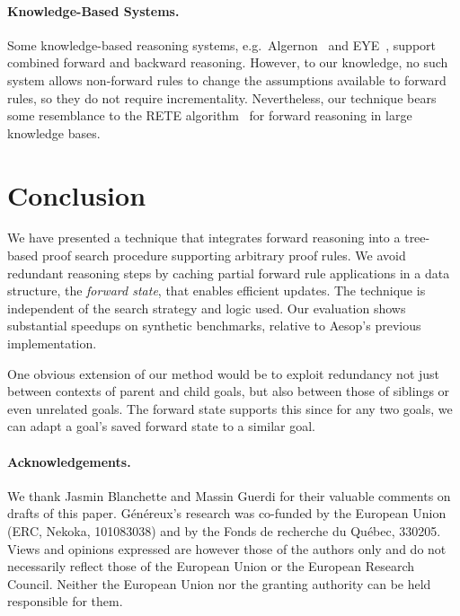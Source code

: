\documentclass[runningheads,leqno]{llncs}
\newcommand{\para}[1]{\paragraph{\bfseries\upshape #1}}
\begin{document}
\para{Knowledge-Based Systems.}
Some knowledge-based reasoning systems, e.g.\ Algernon~\cite{Algernon} and EYE~\cite{EYE}, support combined forward and backward reasoning.
However, to our knowledge, no such system allows non-forward rules to change the assumptions available to forward rules, so they do not require incrementality.
Nevertheless, our technique bears some resemblance to the RETE algorithm~\cite{RETE} for forward reasoning in large knowledge bases.

\section{Conclusion}

We have presented a technique that integrates forward reasoning into a tree-based proof search procedure supporting arbitrary proof rules.
We avoid redundant reasoning steps by caching partial forward rule applications in a data structure, the \emph{forward state}, that enables efficient updates.
The technique is independent of the search strategy and logic used.
Our evaluation shows substantial speedups on synthetic benchmarks, relative to Aesop's previous implementation.

One obvious extension of our method would be to exploit redundancy not just between contexts of parent and child goals, but also between those of siblings or even unrelated goals.
The forward state supports this since for any two goals, we can adapt a goal's saved forward state to a similar goal.

\para{Acknowledgements.}
We thank Jasmin Blanchette and Massin Guerdi for their valuable comments on drafts of this paper.
Généreux's research was co-funded by the European Union (ERC, Nekoka, 101083038) and by the Fonds de recherche du Québec, 330205. Views and opinions expressed are however those of the authors only and do not necessarily reflect those of the European Union or the European Research Council. Neither the European Union nor the granting authority can be held responsible for them.


\end{document}

